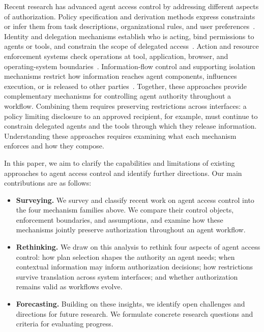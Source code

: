 Recent research has advanced agent access control by addressing different aspects of authorization. Policy specification and derivation methods express constraints or infer them from task descriptions, organizational rules, and user preferences~\cite{conseca,agentspec,guardagent,shieldagent,miniscope,dataperms,drift}. Identity and delegation mechanisms establish who is acting, bind permissions to agents or tools, and constrain the scope of delegated access~\cite{delegation,saga,astra,aip,etdi}. Action and resource enforcement systems check operations at tool, application, browser, and operating-system boundaries~\cite{progent,ac4a,cellmate,agentbound,verisafe,csagent,pcas}. Information-flow control and supporting isolation mechanisms restrict how information reaches agent components, influences execution, or is released to other parties~\cite{camel,fides,ace,airgap,isolate,llmbda}. Together, these approaches provide complementary mechanisms for controlling agent authority throughout a workflow. Combining them requires preserving restrictions across interfaces: a policy limiting disclosure to an approved recipient, for example, must continue to constrain delegated agents and the tools through which they release information. Understanding these approaches requires examining what each mechanism enforces and how they compose.

In this paper, we aim to clarify the capabilities and limitations of existing approaches to agent access control and identify further directions. Our main contributions are as follows:
\begin{itemize}[leftmargin=*]
    \item \textbf{Surveying.} We survey and classify recent work on agent access control into the four mechanism families above. We compare their control objects, enforcement boundaries, and assumptions, and examine how these mechanisms jointly preserve authorization throughout an agent workflow.
    \item \textbf{Rethinking.} We draw on this analysis to rethink four aspects of agent access control: how plan selection shapes the authority an agent needs; when contextual information may inform authorization decisions; how restrictions survive translation across system interfaces; and whether authorization remains valid as workflows evolve.
    \item \textbf{Forecasting.} Building on these insights, we identify open challenges and directions for future research. We formulate concrete research questions and criteria for evaluating progress.
\end{itemize}
